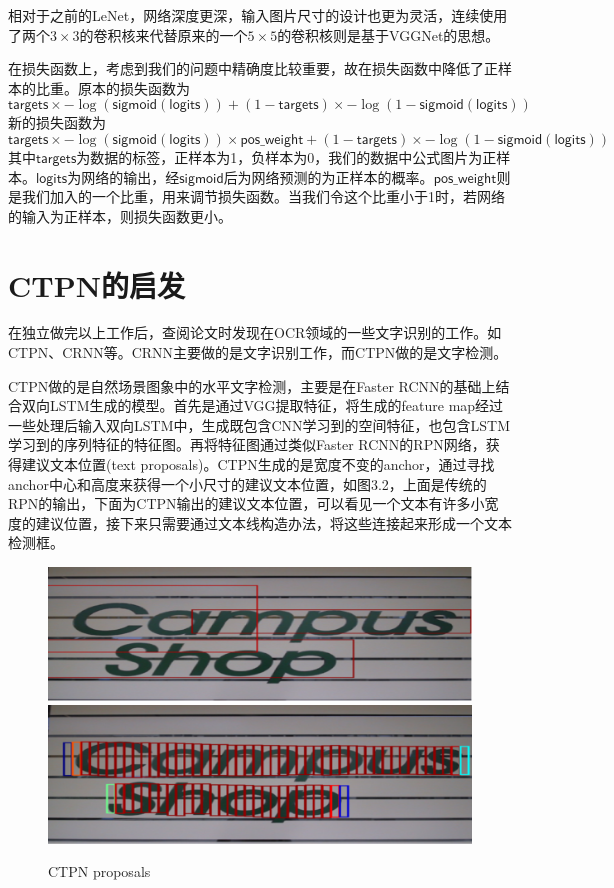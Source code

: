 相对于之前的LeNet，网络深度更深，输入图片尺寸的设计也更为灵活，连续使用了两个$3 \times 3$的卷积核来代替原来的一个$5 \times 5$的卷积核则是基于VGGNet的思想。

在损失函数上，考虑到我们的问题中精确度比较重要，故在损失函数中降低了正样本的比重。原本的损失函数为
\[\mathsf{targets} \times -\log(\mathsf{sigmoid}(\mathsf{logits})) + (1 - \mathsf{targets}) \times -\log(1 - \mathsf{sigmoid}(\mathsf{logits}))\]
新的损失函数为
\[\mathsf{targets} \times -\log(\mathsf{sigmoid}(\mathsf{logits})) \times \mathsf{pos\_weight} +(1 - \mathsf{targets}) \times -\log(1 - \mathsf{sigmoid}(\mathsf{logits}))\]
其中$\mathsf{targets}$为数据的标签，正样本为1，负样本为0，我们的数据中公式图片为正样本。$\mathsf{logits}$为网络的输出，经$\mathsf{sigmoid}$后为网络预测的为正样本的概率。$\mathsf{pos\_weight}$则是我们加入的一个比重，用来调节损失函数。当我们令这个比重小于1时，若网络的输入为正样本，则损失函数更小。

\section{CTPN的启发}
\noindent

在独立做完以上工作后，查阅论文时发现在OCR领域的一些文字识别的工作。如CTPN\cite{ctpn}、CRNN等。CRNN主要做的是文字识别工作，而CTPN做的是文字检测。

CTPN做的是自然场景图象中的水平文字检测，主要是在Faster RCNN的基础上结合双向LSTM生成的模型。首先是通过VGG提取特征，将生成的feature map经过一些处理后输入双向LSTM中，生成既包含CNN学习到的空间特征，也包含LSTM学习到的序列特征的特征图。再将特征图通过类似Faster RCNN的RPN网络，获得建议文本位置(text proposals)。CTPN生成的是宽度不变的anchor，通过寻找anchor中心和高度来获得一个小尺寸的建议文本位置，如图3.2，上面是传统的RPN的输出，下面为CTPN输出的建议文本位置，可以看见一个文本有许多小宽度的建议位置，接下来只需要通过文本线构造办法，将这些连接起来形成一个文本检测框。

\begin{figure}[hp]
    \centering
    \includegraphics[scale=0.5]{eps/rpn.eps}
    \includegraphics[scale=0.5]{eps/ctpn.eps}
    \caption{CTPN proposals}
    \label{fig:label}
\end{figure}

